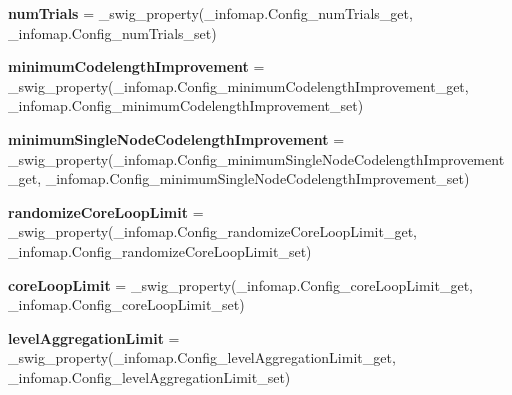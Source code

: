 \begin{DoxyCompactItemize}
\mbox{\label{classdsmacc_1_1graph_1_1infomap_1_1Config_a926767b38b50c21a77c4ad447ee12ff2}} 
{\bfseries num\+Trials} = \+\_\+swig\+\_\+property(\+\_\+infomap.\+Config\+\_\+num\+Trials\+\_\+get, \+\_\+infomap.\+Config\+\_\+num\+Trials\+\_\+set)
\item 
\mbox{\label{classdsmacc_1_1graph_1_1infomap_1_1Config_ab12e4d8efe4e8eb6858f00ebdcf35dd7}} 
{\bfseries minimum\+Codelength\+Improvement} = \+\_\+swig\+\_\+property(\+\_\+infomap.\+Config\+\_\+minimum\+Codelength\+Improvement\+\_\+get, \+\_\+infomap.\+Config\+\_\+minimum\+Codelength\+Improvement\+\_\+set)
\item 
\mbox{\label{classdsmacc_1_1graph_1_1infomap_1_1Config_aff554db62eb35abd303987e3fe0d9cac}} 
{\bfseries minimum\+Single\+Node\+Codelength\+Improvement} = \+\_\+swig\+\_\+property(\+\_\+infomap.\+Config\+\_\+minimum\+Single\+Node\+Codelength\+Improvement\+\_\+get, \+\_\+infomap.\+Config\+\_\+minimum\+Single\+Node\+Codelength\+Improvement\+\_\+set)
\item 
\mbox{\label{classdsmacc_1_1graph_1_1infomap_1_1Config_a0440f1285ca5e65852591ecabc5f4862}} 
{\bfseries randomize\+Core\+Loop\+Limit} = \+\_\+swig\+\_\+property(\+\_\+infomap.\+Config\+\_\+randomize\+Core\+Loop\+Limit\+\_\+get, \+\_\+infomap.\+Config\+\_\+randomize\+Core\+Loop\+Limit\+\_\+set)
\item 
\mbox{\label{classdsmacc_1_1graph_1_1infomap_1_1Config_af4eb95a0a13e70deacb671705641466d}} 
{\bfseries core\+Loop\+Limit} = \+\_\+swig\+\_\+property(\+\_\+infomap.\+Config\+\_\+core\+Loop\+Limit\+\_\+get, \+\_\+infomap.\+Config\+\_\+core\+Loop\+Limit\+\_\+set)
\item 
\mbox{\label{classdsmacc_1_1graph_1_1infomap_1_1Config_a162dd091b6c7fa0d4654494d4d66de8d}} 
{\bfseries level\+Aggregation\+Limit} = \+\_\+swig\+\_\+property(\+\_\+infomap.\+Config\+\_\+level\+Aggregation\+Limit\+\_\+get, \+\_\+infomap.\+Config\+\_\+level\+Aggregation\+Limit\+\_\+set)
\item 
\mbox{\label{classdsmacc_1_1graph_1_1infomap_1_1Config_ad20d803750b2993d86bee7ec3e648925}} 

\end{DoxyCompactItemize}
